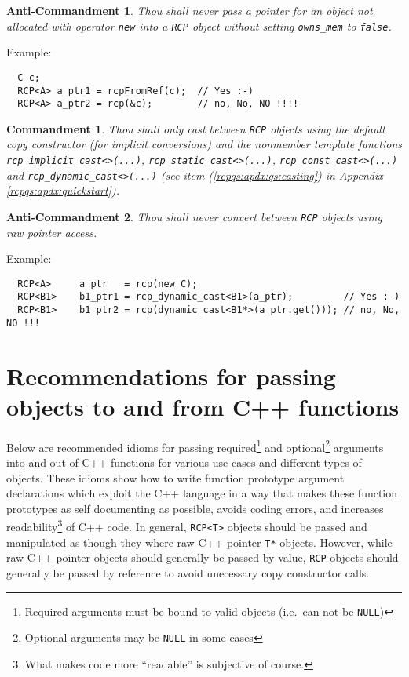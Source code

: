 \documentclass[pdf,ps2pdf,11pt]{SANDreport}
\newtheorem{commandment}{Commandment}
\newtheorem{anticommandment}{Anti-Commandment}
\begin{document}
\begin{anticommandment}
Thou shall never pass a pointer for an object {}\underline{not}
allocated with operator {}\texttt{new} into a
{}\texttt{RCP} object without setting
{}\texttt{owns\_mem} to {}\texttt{false}.
\end{anticommandment}

{}\noindent{}Example:
{\small\begin{verbatim}
  C c;
  RCP<A> a_ptr1 = rcpFromRef(c);  // Yes :-)
  RCP<A> a_ptr2 = rcp(&c);        // no, No, NO !!!!
\end{verbatim}}

\begin{commandment}\label{rcp:cmnd:converstion}
Thou shall only cast between {}\texttt{RCP} objects
using the default copy constructor (for implicit conversions) and the
nonmember template functions {}\texttt{rcp\-\_implicit\-\_cast<>(\-...)},
{}\texttt{rcp\-\_static\-\_cast<>(\-...)},
{}\texttt{rcp\-\_const\-\_cast<>(\-...)} and
{}\texttt{rcp\-\_dynamic\-\_cast<>(\-...)}  (see item
({}\ref{rcpqs:apdx:qs:casting}) in Appendix
{}\ref{rcpqs:apdx:quickstart}).
\end{commandment}

\begin{anticommandment}
Thou shall never convert between {}\texttt{RCP} objects
using raw pointer access.
\end{anticommandment}

{}\noindent{}Example:
{\small\begin{verbatim}
  RCP<A>     a_ptr   = rcp(new C);
  RCP<B1>    b1_ptr1 = rcp_dynamic_cast<B1>(a_ptr);         // Yes :-)
  RCP<B1>    b1_ptr2 = rcp(dynamic_cast<B1*>(a_ptr.get())); // no, No, NO !!!
\end{verbatim}}

%
\section{Recommendations for passing objects to and from C++ functions}
\label{rcpqs:apdx:passing-args}
%

Below are recommended idioms for passing required\footnote{Required
arguments must be bound to valid objects (i.e.~can not be
{}\texttt{NULL})} and optional\footnote{Optional arguments may be
{}\texttt{NULL} in some cases} arguments into and out of C++ functions
for various use cases and different types of objects.  These idioms
show how to write function prototype argument declarations which
exploit the C++ language in a way that makes these function prototypes
as self documenting as possible, avoids coding errors, and increases
readability\footnote{What makes code more ``readable'' is subjective
of course.} of C++ code.  In general, {}\texttt{RCP<T>} objects should
be passed and manipulated as though they where raw C++ pointer
{}\texttt{T*} objects.  However, while raw C++ pointer objects should
generally be passed by value, {}\texttt{RCP} objects should generally
be passed by reference to avoid unecessary copy constructor calls.
\end{document}
